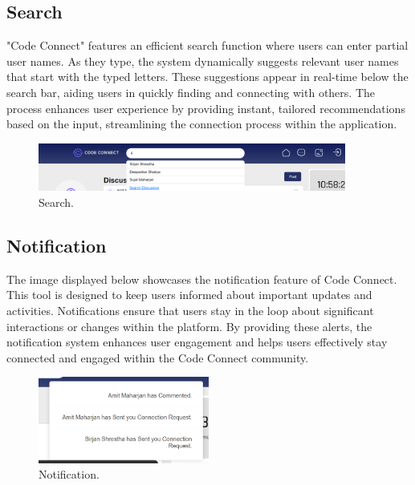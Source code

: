 \subsection{Search}
"Code Connect" features an efficient search function where users can enter partial user names. As they type, the system dynamically suggests relevant user names that start with the typed letters. These suggestions appear in real-time below the search bar, aiding users in quickly finding and connecting with others. The process enhances user experience by providing instant, tailored recommendations based on the input, streamlining the connection process within the application.
\begin{figure}[H]
    \centering
    \includegraphics[width=0.9\textwidth]{Outcome-ss/search-bar.png}
    \caption{Search.}
    \label{fig:Search}
\end{figure}

\subsection{Notification}
The image displayed below showcases the notification feature of Code Connect. This tool is designed to keep users informed about important updates and activities. Notifications ensure that users stay in the loop about significant interactions or changes within the platform. By providing these alerts, the notification system enhances user engagement and helps users effectively stay connected and engaged within the Code Connect community.
\begin{figure}[H]
    \centering
    \includegraphics[width=0.5\textwidth]{Outcome-ss/notification.png}
    \caption{Notification.}
    \label{fig:Notification}
\end{figure}

\newpage
